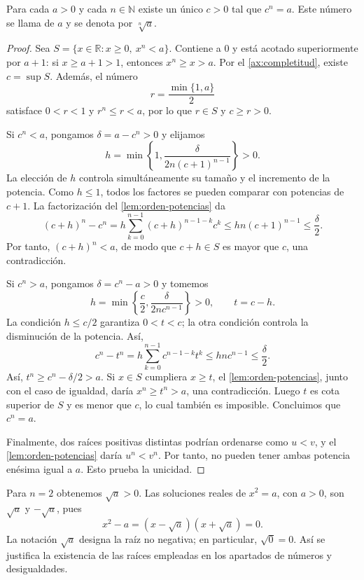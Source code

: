 \begin{samepage}
\begin{theorem}
\label{teo:raices-positivas}
Para cada $a>0$ y cada $n\in\mathbb{N}$ existe un único $c>0$ tal que $c^n=a$. Este número se llama  de $a$ y se denota por $\sqrt[n]{a}$.
\end{theorem}
\end{samepage}

\begin{proof}
Sea $S=\{x\in\mathbb{R}:x\geq0,\ x^n<a\}$. Contiene a $0$ y está acotado superiormente por $a+1$: si $x\geq a+1>1$, entonces $x^n\geq x>a$. Por el \cref{ax:completitud}, existe $c=\sup S$. Además, el número
\[
 r=\frac{\min\{1,a\}}2
\]
satisface $0<r<1$ y $r^n\leq r<a$, por lo que $r\in S$ y $c\geq r>0$.

Si $c^n<a$, pongamos $\delta=a-c^n>0$ y elijamos
\[
 h=\min\left\{1,\frac{\delta}{2n(c+1)^{n-1}}\right\}>0.
\]
La elección de $h$ controla simultáneamente su tamaño y el incremento de la potencia. Como $h\leq1$, todos los factores se pueden comparar con potencias de $c+1$. La factorización del \cref{lem:orden-potencias} da
\[
 (c+h)^n-c^n
 =h\sum_{k=0}^{n-1}(c+h)^{n-1-k}c^k
 \leq hn(c+1)^{n-1}
 \leq\frac{\delta}{2}.
\]
Por tanto, $(c+h)^n<a$, de modo que $c+h\in S$ es mayor que $c$, una contradicción.

Si $c^n>a$, pongamos $\delta=c^n-a>0$ y tomemos
\[
 h=\min\left\{\frac c2,\frac{\delta}{2n c^{n-1}}\right\}>0,
 \qquad t=c-h.
\]
La condición $h\leq c/2$ garantiza $0<t<c$; la otra condición controla la disminución de la potencia. Así,
\[
 c^n-t^n
 =h\sum_{k=0}^{n-1}c^{n-1-k}t^k
 \leq hn c^{n-1}
 \leq\frac{\delta}{2}.
\]
Así, $t^n\geq c^n-\delta/2>a$. Si $x\in S$ cumpliera $x\geq t$, el \cref{lem:orden-potencias}, junto con el caso de igualdad, daría $x^n\geq t^n>a$, una contradicción. Luego $t$ es cota superior de $S$ y es menor que $c$, lo cual también es imposible. Concluimos que $c^n=a$.

Finalmente, dos raíces positivas distintas podrían ordenarse como $u<v$, y el \cref{lem:orden-potencias} daría $u^n<v^n$. Por tanto, no pueden tener ambas potencia enésima igual a $a$. Esto prueba la unicidad.
\end{proof}

\begin{remark}
Para $n=2$ obtenemos $\sqrt a>0$. Las soluciones reales de $x^2=a$, con $a>0$, son $\sqrt a$ y $-\sqrt a$, pues
\[
 x^2-a=(x-\sqrt a)(x+\sqrt a)=0.
\]
La notación $\sqrt a$ designa la raíz no negativa; en particular, $\sqrt0=0$. Así se justifica la existencia de las raíces empleadas en los apartados de números y desigualdades.
\end{remark}

